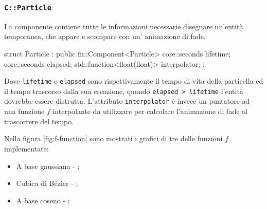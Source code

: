\subsubsection{\texttt{C::Particle}}
La componente  contiene tutte le informazioni necessarie disegnare un'entità temporanea, che appare e scompare con un' animazione di fade.
\begin{cpp}
 struct Particle : public fn::Component<Particle> {
     core::seconds lifetime;
     core::seconds elapsed;
     std::function<float(float)> interpolator;
 };
\end{cpp}
Dove \texttt{lifetime} e \texttt{elapsed} sono rispettivamente il tempo di vita della particella ed il tempo trascorso dalla sua creazione, quando \texttt{elapsed > lifetime} l'entità dovrebbe essere distrutta. 
L'attributo \texttt{interpolator} è invece un puntatore ad una funzione $f$ interpolante da utilizzare per calcolare l'animazione di fade al trascorrere del tempo. 

Nella figura \ref{fig:f-function} sono mostrati i grafici di tre delle funzioni $f$ implementate:
\begin{itemize}
	\item A base gaussiana - ;
	\item Cubica di Bézier -  ;
	\item A base coseno -  ;
\end{itemize}

